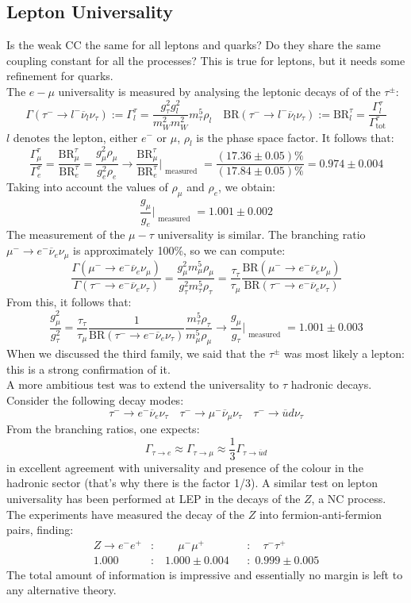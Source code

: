 \documentclass[10.75pt,a4paper,openright,bottom=2cm]{article}
\begin{document}
\subsection{Lepton Universality}
Is the weak CC the same for all leptons and quarks? Do they share the same coupling constant for all the processes? This is true for leptons, but it needs some refinement for quarks.\\
The $e-\mu$ universality is measured by analysing the leptonic decays of of the $\tau^\pm$:
\[
\Gamma(\tau^-\to l^-\overline{\nu}_l\nu_\tau):=\Gamma_l^\tau=\frac{g_\tau^2g_l^2}{m_W^2m_W^2}m_\tau^5\rho_l \quad \text{BR}(\tau^-\to l^-\overline{\nu}_l\nu_\tau):=\text{BR}^\tau_l=\frac{\Gamma_l^\tau}{\Gamma^\tau_{\text{tot}}}
\]
$l$ denotes the lepton, either $e^-$ or $\mu$, $\rho_l$ is the phase space factor. It follows that:
\[
\frac{\Gamma_\mu^\tau}{\Gamma_e^\tau}=\frac{\text{BR}_\mu^\tau}{\text{BR}_e^\tau}=\frac{g_\mu^2\rho_\mu}{g_e^2\rho_e}\to\frac{\text{BR}_\mu^\tau}{\text{BR}_e^\tau}\Bigr|_{\substack{\text{measured}}}=\frac{(17.36\pm0.05)\%}{(17.84\pm0.05)\%}=0.974\pm0.004
\]
Taking into account the values of $\rho_\mu$ and $\rho_e$, we obtain:
\[
\frac{g_\mu}{g_e}\Bigr|_{\substack{\text{measured}}}=1.001\pm0.002
\]
The measurement of the $\mu-\tau$ universality is similar. The branching ratio $\mu^-\to e^-\overline{\nu}_e\nu_\mu$ is approximately 100\%, so we can compute:
\[
\frac{\Gamma(\mu^-\to e^-\overline{\nu}_e\nu_\mu)}{\Gamma(\tau^-\to e^-\overline{\nu}_e\nu_\tau)}=\frac{g_\mu^2m_\mu^5\rho_\mu}{g_\tau^2m_\tau^5\rho_\tau}=\frac{\tau_\tau}{\tau_\mu}\frac{\text{BR}(\mu^-\to e^-\overline{\nu}_e\nu_\mu)}{\text{BR}(\tau^-\to e^-\overline{\nu}_e\nu_\tau)}
\]
From this, it follows that:
\[
\frac{g_\mu^2}{g_\tau^2}=\frac{\tau_\tau}{\tau_\mu}\frac{1}{\text{BR}(\tau^-\to e^-\overline{\nu}_e\nu_\tau)}\frac{m_\tau^5\rho_\tau}{m_\mu^5\rho_\mu}\to\frac{g_\mu}{g_\tau}\Bigr|_{\substack{\text{measured}}}=1.001\pm0.003
\]
When we discussed the third family, we said that the $\tau^\pm$ was most likely a lepton: this is a strong confirmation of it.\\
A more ambitious test was to extend the universality to $\tau$ hadronic decays. Consider the following decay modes:
\[
\tau^-\to e^-\overline{\nu}_e\nu_\tau \quad \tau^-\to\mu^-\overline{\nu}_\mu\nu_\tau \quad \tau^-\to\overline{u}d\nu_\tau
\]
From the branching ratios, one expects:
\[
\Gamma_{\tau\to e}\approx\Gamma_{\tau\to\mu}\approx\frac{1}{3}\Gamma_{\tau\to\overline{u}d}
\]
in excellent agreement with universality and presence of the colour in the hadronic sector (that's why there is the factor 1/3). A similar test on lepton universality has been performed at LEP in the decays of the $Z$, a NC process. The experiments have measured the decay of the $Z$ into fermion-anti-fermion pairs, finding:
\[
\begin{aligned}
Z\to e^-e^+&:\qquad\mu^-\mu^+&&:\quad\tau^-\tau^+\\
1.000&:\;\;\;1.000\pm0.004&&:\;0.999\pm0.005
\end{aligned}
\]
The total amount of information is impressive and essentially no margin is left to any alternative theory.
\end{document}
